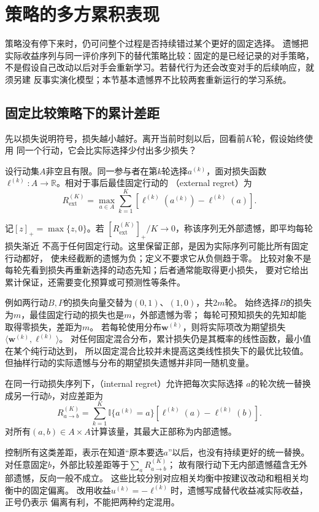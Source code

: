 \section{策略的多方累积表现}
\label{sec:game-regret-cfr}

策略没有停下来时，仍可问整个过程是否持续错过某个更好的固定选择。
遗憾把实际收益序列与同一评价序列下的替代策略比较：固定的是已经记录的对手策略，
不是假设自己改动以后对手会重新学习。若替代行为还会改变对手的后续响应，就须另建
反事实演化模型；本节基本遗憾界不比较两套重新运行的学习系统。

\subsection{固定比较策略下的累计差距}
\label{sec:game-regret-comparators}

先以损失说明符号，损失越小越好。离开当前时刻以后，回看前\(K\)轮，假设始终使用
同一个行动，它会比实际选择少付出多少损失？
\begin{definition}[外部遗憾]
\label{def:game-external-regret}
设行动集\(A\)非空且有限。同一参与者在第\(k\)轮选择\(a^{(k)}\)，面对损失函数
\(\ell^{(k)}:A\to\mathbb R\)。相对于事后最佳固定行动的
（external regret）为
\begin{equation}
  R_{\mathrm{ext}}^{(K)}
  =\max_{a\in A}\sum_{k=1}^K
    [\ell^{(k)}(a^{(k)})-\ell^{(k)}(a)].
  \label{eq:game-external-regret}
\end{equation}
\end{definition}
记\([z]_+=\max\{z,0\}\)。若
\([R_{\mathrm{ext}}^{(K)}]_+/K\to0\)，称该序列无外部遗憾，即平均每轮损失渐近
不高于任何固定行动。这里保留正部，是因为实际序列可能比所有固定行动都好，
使未经截断的遗憾为负；定义不要求它从负侧趋于零。
比较对象不是每轮先看到损失再重新选择的动态先知；后者通常能取得更小损失，
要对它给出累计保证，还需要变化预算或可预测性等条件。

例如两行动\(B,P\)的损失向量交替为\((0,1)\)、\((1,0)\)，共\(2m\)轮。
始终选择\(B\)的损失为\(m\)，最佳固定行动的损失也是\(m\)，外部遗憾为零；
每轮可预知损失的先知却能取得零损失，差距为\(m\)。
若每轮使用分布\(\bm w^{(k)}\)，则将实际项改为期望损失
\(\langle\bm w^{(k)},\bm\ell^{(k)}\rangle\)。
对任何固定混合分布，累计损失仍是其概率的线性函数，最小值在某个纯行动达到，
所以固定混合比较并未提高这类线性损失下的最优比较值。
但抽样行动的实际遗憾与分布的期望损失遗憾并非同一随机变量。

\begin{definition}[内部遗憾]
\label{def:game-internal-regret}
在同一行动损失序列下，（internal regret）允许把每次实际选择
\(a\)的轮次统一替换成另一行动\(b\)，对应差距为
\[
  R_{a\to b}^{(K)}
  =\sum_{k=1}^K\mathbb I\{a^{(k)}=a\}
    [\ell^{(k)}(a)-\ell^{(k)}(b)].
\]
对所有\((a,b)\in A\times A\)计算该量，其最大正部称为内部遗憾。
\end{definition}
控制所有这类差距，表示在知道“原本要选\(a\)”以后，也没有持续更好的统一替换。
对任意固定\(b\)，外部比较差距等于\(\sum_aR_{a\to b}^{(K)}\)；
故有限行动下无内部遗憾蕴含无外部遗憾，反向一般不成立。
这些比较分别对应相关均衡中按建议改动和粗相关均衡中的固定偏离。
改用收益\(u^{(k)}=-\ell^{(k)}\)时，遗憾写成替代收益减实际收益，正号仍表示
偏离有利，不能把两种约定混用。

